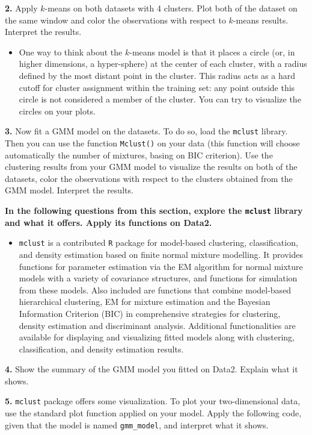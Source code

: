 \documentclass[]{book}
\newenvironment{rmdblock}[1]
  {\begin{shaded*}
  \begin{itemize}
  \renewcommand{\labelitemi}{
    \raisebox{-.7\height}[0pt][0pt]{
      {\setkeys{Gin}{width=2em,keepaspectratio}\texttt{[image: img/icons/\#1]}}
    }
  }
  \item
  }
  {
  \end{itemize}
  \end{shaded*}
  }
\newenvironment{rmdinsight}
  {\begin{rmdblock}{insight}}
  {\end{rmdblock}}
\theoremstyle{definition}
\theoremstyle{definition}
\theoremstyle{definition}
\theoremstyle{remark}
\begin{document}
\textbf{2.} Apply \(k\)-means on both datasets with 4 clusters. Plot
both of the dataset on the same window and color the observations with
respect to \(k\)-means results. Interpret the results.

\begin{rmdinsight}
One way to think about the \(k\)-means model is that it places a circle
(or, in higher dimensions, a hyper-sphere) at the center of each
cluster, with a radius defined by the most distant point in the cluster.
This radius acts as a hard cutoff for cluster assignment within the
training set: any point outside this circle is not considered a member
of the cluster. You can try to visualize the circles on your plots.
\end{rmdinsight}

\textbf{3.} Now fit a GMM model on the datasets. To do so, load the
\texttt{mclust} library. Then you can use the function \texttt{Mclust()}
on your data (this function will choose automatically the number of
mixtures, basing on BIC criterion). Use the clustering results from your
GMM model to visualize the results on both of the datasets, color the
observations with respect to the clusters obtained from the GMM model.
Interpret the results.

\textbf{In the following questions from this section, explore the
\texttt{mclust} library and what it offers. Apply its functions on
Data2.}

\begin{rmdinsight}
\texttt{mclust} is a contributed \texttt{R} package for model-based
clustering, classification, and density estimation based on finite
normal mixture modelling. It provides functions for parameter estimation
via the EM algorithm for normal mixture models with a variety of
covariance structures, and functions for simulation from these models.
Also included are functions that combine model-based hierarchical
clustering, EM for mixture estimation and the Bayesian Information
Criterion (BIC) in comprehensive strategies for clustering, density
estimation and discriminant analysis. Additional functionalities are
available for displaying and visualizing fitted models along with
clustering, classification, and density estimation results.
\end{rmdinsight}

\textbf{4.} Show the summary of the GMM model you fitted on Data2.
Explain what it shows.

\textbf{5.} \texttt{mclust} package offers some visualization. To plot
your two-dimensional data, use the standard plot function applied on
your model. Apply the following code, given that the model is named
\texttt{gmm\_model}, and interpret what it shows.
\end{document}
